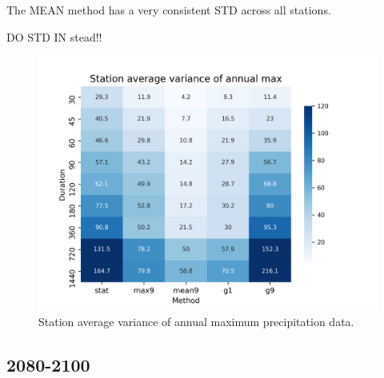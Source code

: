 The MEAN method has a very consistent STD across all stations.


DO STD IN stead!! 

\begin{figure}[hbt!]
    \centering
    \includegraphics[scale=0.6]{figures/AM_station_avg_variance.png}
    \caption{Station average variance of annual maximum precipitation data.}
    \label{fig:AM_dur}
\end{figure}

\subsection{2080-2100}
